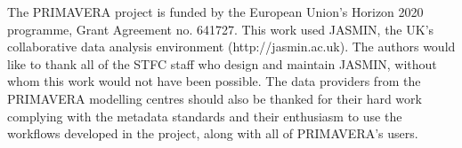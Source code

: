 \documentclass[gmd, manuscript]{copernicus}
\begin{document}

\begin{acknowledgements}
The PRIMAVERA project is funded by the European Union's Horizon 2020 programme, Grant Agreement no. 641727. This work used JASMIN, the UK's collaborative data analysis environment (http://jasmin.ac.uk). The authors would like to thank all of the STFC staff who design and maintain JASMIN, without whom this work would not have been possible. The data providers from the PRIMAVERA modelling centres should also be thanked for their hard work complying with the metadata standards and their enthusiasm to use the workflows developed in the project, along with all of PRIMAVERA's users.
\end{acknowledgements}






%
%
%









\end{document}
